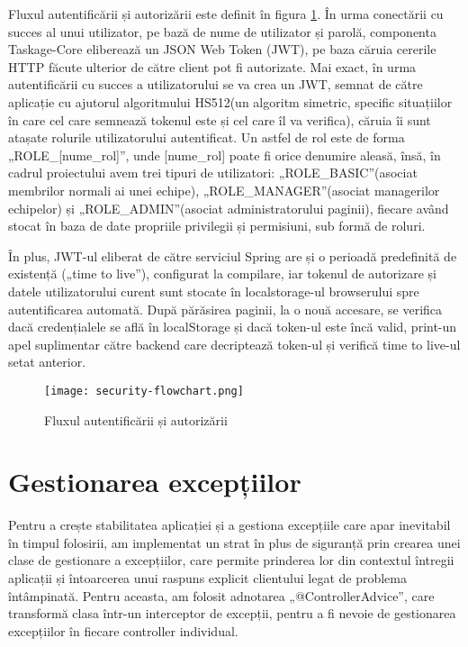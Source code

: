 Fluxul autentificării și autorizării este definit în figura \ref{authentication-flow}. În urma conectării cu succes al unui utilizator, pe bază de nume de utilizator și parolă, componenta Taskage-Core eliberează un JSON Web Token (JWT), pe baza căruia cererile HTTP făcute ulterior de către client pot fi autorizate. Mai exact, în urma autentificării cu succes a utilizatorului se va crea un JWT, semnat de către aplicație cu ajutorul algoritmului HS512(un algoritm simetric, specific situațiilor în care cel care semnează tokenul este și cel care îl va verifica), căruia îi sunt atașate rolurile utilizatorului autentificat. Un astfel de rol este de forma „ROLE_[nume_rol]”, unde [nume_rol] poate fi orice denumire aleasă, însă, în cadrul proiectului avem trei tipuri de utilizatori: „ROLE_BASIC”(asociat membrilor normali ai unei echipe), „ROLE_MANAGER”(asociat managerilor echipelor) și „ROLE_ADMIN”(asociat administratorului paginii), fiecare având stocat în baza de date propriile privilegii și permisiuni, sub formă de roluri.

În plus, JWT-ul eliberat de către serviciul Spring are și o perioadă predefinită de existență („time to live”), configurat la compilare, iar tokenul de autorizare și datele utilizatorului curent sunt stocate în localstorage-ul browserului spre autentificarea automată. După părăsirea paginii, la o nouă accesare, se verifica dacă credențialele se află în localStorage și dacă token-ul este încă valid, print-un apel suplimentar către backend care decriptează token-ul și verifică time to live-ul setat anterior.

 \begin{figure}[H]
	\centering
 	 \texttt{[image: security-flowchart.png]}
	\caption{Fluxul autentificării și autorizării}
	\label{authentication-flow}
 \end{figure}

\section{Gestionarea excepțiilor}

Pentru a crește stabilitatea aplicației și a gestiona excepțiile care apar inevitabil în timpul folosirii, am implementat un strat în plus de siguranță prin crearea unei clase de gestionare a excepțiilor, care permite prinderea lor din contextul întregii aplicații și întoarcerea unui raspuns explicit clientului legat de problema întâmpinată. Pentru aceasta, am folosit adnotarea „@ControllerAdvice”, care transformă clasa într-un interceptor de excepții, pentru a fi nevoie de gestionarea excepțiilor în fiecare controller individual.

